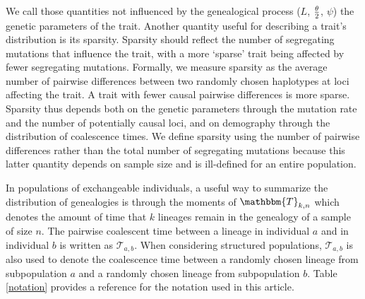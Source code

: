 We call those quantities not influenced by the genealogical process ($L$, $\frac{\theta}{2}$,
$\psi$) the genetic parameters of the trait. Another quantity useful for
describing a trait's distribution is its sparsity. Sparsity should reflect the
number of segregating mutations that influence the trait, with a more `sparse'
trait being affected by fewer segregating mutations. Formally, we measure
sparsity as the average number of pairwise differences between two randomly
chosen haplotypes at loci affecting the trait. A trait with fewer causal
pairwise differences is more sparse. Sparsity thus depends both on the genetic
parameters through the mutation rate and the number of potentially causal loci,
and on demography through the distribution of coalescence times. We define
sparsity using the number of pairwise differences rather than the total number
of segregating mutations because this latter quantity depends on sample size and
is ill-defined for an entire population. 

In populations of exchangeable individuals, a useful way to summarize the
distribution of genealogies is through the moments of $\mathbbm{T}_{k,n}$ which
denotes the amount of time that $k$ lineages remain in the genealogy of a sample
of size $n$. The pairwise coalescent time between a lineage in individual $a$
and in individual $b$ is written as $\mathcal{T}_{a,b}$. When considering
structured populations, $\mathcal{T}_{a,b}$ is also used to denote the
coalescence time between a randomly chosen lineage from subpopulation $a$ and a
randomly chosen lineage from subpopulation $b$. Table \ref{notation} provides a
reference for the notation used in this article. 

